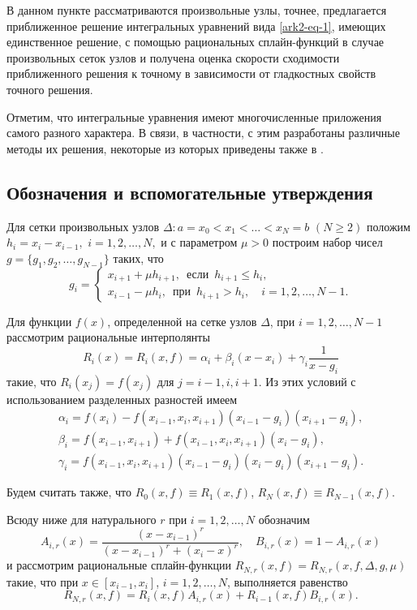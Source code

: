 В данном пункте рассматриваются произвольные узлы, точнее, предлагается приближенное
решение интегральных уравнений вида \eqref{ark2-eq-1}, имеющих единственное решение, с помощью
 рациональных сплайн-функций в случае произвольных сеток узлов и получена оценка
 скорости сходимости приближенного решения к точному в зависимости от гладкостных
 свойств точного решения.

Отметим, что интегральные уравнения имеют многочисленные приложения самого разного
характера. В связи, в частности, с этим разработаны различные методы их решения, некоторые
из которых приведены также в \cite{ark-1,ark-2,ark-3}.


\subsection{Обозначения и вспомогательные утверждения}

Для сетки произвольных узлов $\Delta: a=x_0<x_1<\dots<x_N=b$ $(N\geqslant 2)$ положим
$h_i=x_i-x_{i-1},$ $i=1,2,\dots,N,$ и с параметром  $\mu>0$ построим набор чисел
$g=\{g_1,g_2, \dots,g_{N-1}\}$ таких, что
\begin{equation}\label{ark2-eq-2}
g_i=\begin{cases}
x_{i+1}+\mu h_{i+1}, \,\text{ если }\, h_{i+1}\leqslant h_i,\\
x_{i-1}-\mu h_i, \,\text{ при }\, h_{i+1}> h_i, \quad i=1,2,\dots,N-1.
\end{cases}
\end{equation}

Для функции $f(x)$, определенной на сетке узлов $\Delta$,
при $i=1,2,\dots,N-1$
рассмотрим рациональные интерполянты
\begin{equation}\label{ark2-eq-3}
R_i(x)=R_i(x,f)=\alpha_i+\beta_i(x-x_i)+\gamma_i\frac 1{x-g_i}
\end{equation}
такие, что $R_i(x_j)=f(x_j)$ для $j=i-1,i,i+1$. Из этих условий с использованием
 разделенных разностей имеем
$$
\begin{array}{lcl}
\alpha_i=f(x_i)-f(x_{i-1}, x_i, x_{i+1})(x_{i-1}-g_i)(x_{i+1}-g_i),\\
\beta_i=f(x_{i-1}, x_{i+1})+f(x_{i-1}, x_i, x_{i+1})(x_i-g_i),\\
\gamma_i=f(x_{i-1}, x_i, x_{i+1})(x_{i-1}-g_i)(x_i-g_i)(x_{i+1}-g_i).
\end{array}
$$

Будем считать также, что $R_0(x,f)\equiv R_1(x,f)$, $R_N(x,f)\equiv R_{N-1}(x,f)$.

Всюду ниже для натурального $r$ при $i=1,2,\dots,N$ обозначим
$$
A_{i,r}(x)=\frac{(x-x_{i-1})^r}{(x-x_{i-1})^r+(x_i-x)^r},\quad B_{i,r}(x)=1-A_{i,r}(x)
$$
 и рассмотрим рациональные  сплайн-функции
$R_{N,r}(x,f)=R_{N,r}(x,f,\Delta,g,\mu)$ такие, что при $x\in [x_{i-1}, x_i]$,
 $i=1,2,\dots,N$, выполняется равенство
\begin{equation}\label{ark2-eq-4}
R_{N,r}(x,f)=R_i(x,f)A_{i,r}(x)+R_{i-1}(x,f)B_{i,r}(x).
\end{equation}

